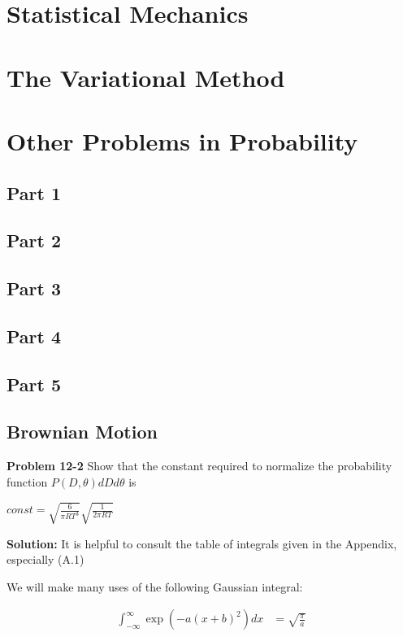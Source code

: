 \documentclass{article}
\begin{document}
\section{Statistical Mechanics}

\section{The Variational Method}

\section{Other Problems in Probability}

\subsection{Part 1}

\subsection{Part 2}

\subsection{Part 3}

\subsection{Part 4}

\subsection{Part 5}

\subsection{Brownian Motion}

\textbf{Problem 12-2}
Show that the constant required to normalize the probability function  $P(D,\theta)dD d \theta$ is 

$const = \sqrt{\frac{6}{\pi R T^3}}\sqrt{\frac{1}{2\pi RT}}$


\textbf{Solution:} 
It is helpful to consult the table of integrals given in the Appendix, especially (A.1)

We will make many uses of the following Gaussian integral: 

\begin{align*}
         \int_{-\infty}^{\infty} \exp(-a(x + b)^2)dx &= \sqrt{\frac{\pi}{a}}
\end{align*}
\end{document}
